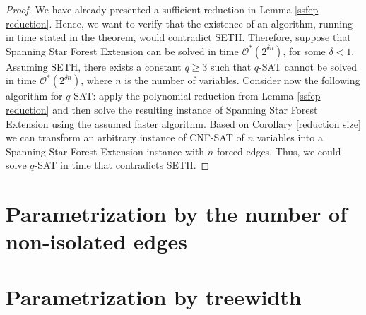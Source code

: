 \documentclass[en]{pracamgr}
\newcommand{\ssfep}{{\sc Spanning Star Forest Extension}}
\newcommand{\cnfsat}{{\sc CNF-SAT}}
\begin{document}
\begin{proof}
	We have already presented a sufficient reduction in Lemma \ref{ssfep reduction}. Hence, we want to verify that the existence of an algorithm, running in time stated in the theorem, would contradict SETH. Therefore, suppose that \ssfep{} can be solved in time $\mathcal{O}^*(2^{\delta n})$, for some $\delta < 1$. Assuming SETH, there exists a constant $q \geq 3$ such that $q${\sc -SAT} cannot be solved in time $\mathcal{O}^*(2^{\delta n})$, where $n$ is the number of variables. Consider now the following algorithm for $q${\sc -SAT}: apply the polynomial reduction from Lemma \ref{ssfep reduction} and then solve the resulting instance of \ssfep{} using the assumed faster algorithm. Based on Corollary \ref{reduction size} we can transform an arbitrary instance of \cnfsat{} of $n$ variables into a \ssfep{} instance with $n$ forced edges. Thus, we could solve $q${\sc -SAT} in time that contradicts SETH.
\end{proof}

\section{Parametrization by the number of non-isolated edges}

\section{Parametrization by treewidth}

\begin{thebibliography}{99}


\end{thebibliography}
\end{document}
